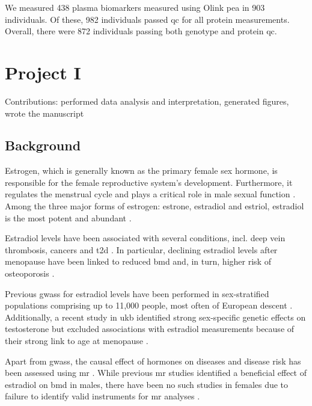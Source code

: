 \documentclass[twoside=false]{scrbook}
\begin{document}
We measured 438 plasma biomarkers measured using Olink \gls{pea} in 903 individuals.
Of these, 982 individuals passed \gls{qc} for all protein measurements.
Overall, there were 872 individuals passing both genotype and protein \gls{qc}.



\chapter{Project I}
{
    \parindent 0pt \color{gray}
    Contributions: performed data analysis and interpretation, generated figures, wrote the manuscript
}

\section{Background}
Estrogen, which is generally known as the primary female sex hormone, is responsible for the female reproductive system's development.
Furthermore, it regulates the menstrual cycle and plays a critical role in male sexual function \cite{Bates2013b,Hess1997b}. 
Among the three major forms of estrogen: estrone, estradiol and estriol, estradiol is the most potent and abundant \cite{Thomas2013c}.

Estradiol levels have been associated with several conditions, incl. deep vein thrombosis, cancers and \gls{t2d} \cite{Cauley1999a, Rosendaal2003b,Vikan2010}.
In particular, declining estradiol levels after menopause have been linked to reduced \gls{bmd} and, in turn, higher risk of osteoporosis \cite{Riggs1998a,Longo2012a}.

Previous \glspl{gwas} for estradiol levels have been performed in sex-stratified populations comprising up to 11,000 people, most often of European descent \cite{Pott2019e,Chen2013d,Liu2013b,Prescott2012f,Eriksson2018b}.
Additionally, a recent study in \gls{ukb} identified strong sex-specific genetic effects on testosterone but excluded associations with estradiol measurements because of their strong link to age at menopause \cite{Ruth2020d}.

Apart from \glspl{gwas}, the causal effect of hormones on diseases and disease risk has been assessed using \gls{mr} \cite{Eriksson2018b,Ruth2020d, Nethander2018a}.
While previous \gls{mr} studies identified a beneficial effect of estradiol on \gls{bmd} in males, there have been no such studies in females due to failure to identify valid instruments for \gls{mr} analyses \cite{Eriksson2018b, Nethander2018a}.
\end{document}
